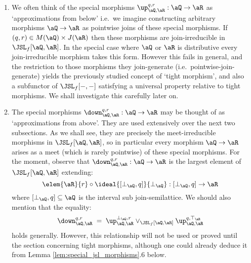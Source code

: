 \documentclass{article}
\begin{document}
\begin{note}
\item
\begin{enumerate}
\item
We often think of the special morphisms $\up_{\aQ,\aR}^{q,r} : \aQ \to \aR$ as `approximations from below' i.e.\ we imagine constructing arbitrary morphisms $\aQ \to \aR$ as pointwise joins of these special morphisms. If $(q,r) \in M(\aQ) \times J(\aR)$ then these morphisms are join-irreducible in $\JSL_f[\aQ,\aR]$. In the special case where $\aQ$ or $\aR$ is distributive every join-irreducible morphism takes this form. However this fails in general, and the restriction to those morphisms they join-generate (i.e.\ pointwise-join-generate) yields the previously studied concept of `tight morphism', and also a subfunctor of $\JSL_f[-,-]$ satisfying a universal property relative to tight morphisms. We shall investigate this carefully later on.

\item
The special morphisms $\down_{\aQ,\aR}^{q,r} : \aQ \to \aR$ may be thought of as `approximations from above'. They are used extensively over the next two subsections. As we shall see, they are precisely the meet-irreducible morphisms in $\JSL_f[\aQ,\aR]$, so in particular every morphism $\aQ \to \aR$ arises as a meet (which is rarely  pointwise) of these special morphisms. For the moment, observe that $\down_{\aQ,\aR}^{q,r} : \aQ \to \aR$ is the largest element of $\JSL_f[\aQ,\aR]$ extending:
\[
\elem{\aR}{r} \circ \ideal{[\bot_\aQ,q]}{\bot_\aQ} : [\bot_\aQ,q] \to \aR
\]
where $[\bot_\aQ,q] \subseteq \aQ$ is the interval sub join-semilattice. We should also mention that the equality:
\[
\down_{\aQ,\aR}^{q,r} \; = \; \up_{\aQ,\aR}^{\bot_\aQ,r} \lor_{\JSL_f[\aQ,\aR]} \up_{\aQ,\aR}^{q,\top_\aR}
\]
holds generally. However, this relationship will not be used or proved until the section concerning tight morphisms, although one could already deduce it from Lemma \ref{lem:special_jsl_morphisms}.6 below. \endbox
\end{enumerate}
\end{note}
\end{document}
